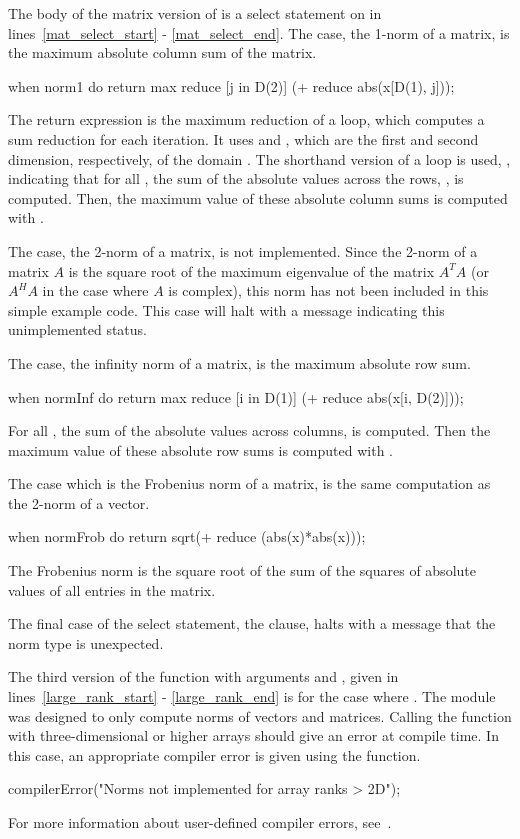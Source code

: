 The body of the matrix version of 
is a select statement on  in lines~\ref{mat_select_start} - \ref{mat_select_end}.
The  case, 
the 1-norm of a matrix, is the maximum absolute column sum of the matrix. 
\begin{chapel}
      when norm1 do           
        return max reduce [j in D(2)] (+ reduce abs(x[D(1), j])); 
\end{chapel}
The return expression is the maximum reduction of a  loop, which computes
a sum reduction for each iteration.  
It uses  and , which are the first and second dimension,
respectively, of the domain .  The shorthand version of a 
loop is used, \chpl{[j in D(2)]}, indicating that
for all , the sum
of the absolute values across the rows, , is computed. 
Then, the maximum value of these  absolute column sums is computed with
.  

The  case, the 2-norm of a matrix, is not
implemented.  Since the 2-norm of a matrix $A$ is the square root of the maximum
eigenvalue of the matrix $A^TA$ (or $A^HA$ in the case where $A$ is complex),
this norm has not been included in this simple example code.
This case will halt with a message indicating this unimplemented
status.  

The  case, the infinity norm of a matrix, is the maximum
absolute row sum.  
\begin{chapel}
      when normInf do  
        return max reduce [i in D(1)] (+ reduce abs(x[i, D(2)])); 
\end{chapel}
For all , the sum of the absolute values across columns,
 is computed.  Then the maximum value of these
 absolute row sums is computed with .  

The 
case which is the Frobenius norm of a matrix, is the same computation as the
2-norm of a vector.  
\begin{chapel}
      when normFrob do return sqrt(+ reduce (abs(x)*abs(x))); 
\end{chapel}
The Frobenius norm is the square root of the sum of the
squares of absolute values of all entries in the matrix.  

The final case of
the select statement, the  clause, halts with a message that
the norm type is unexpected.

The third version of the  function with arguments 
and , given in lines~\ref{large_rank_start} - \ref{large_rank_end} 
is for the case where .
The module was designed to only compute norms of vectors and matrices.  
Calling the  function with three-dimensional or higher arrays 
should give an error at compile time.  In this case, an appropriate compiler error 
is given using the  function.  
\begin{chapel}
    compilerError("Norms not implemented for array ranks > 2D"); 
\end{chapel}
For more information about 
user-defined compiler errors, see~.

